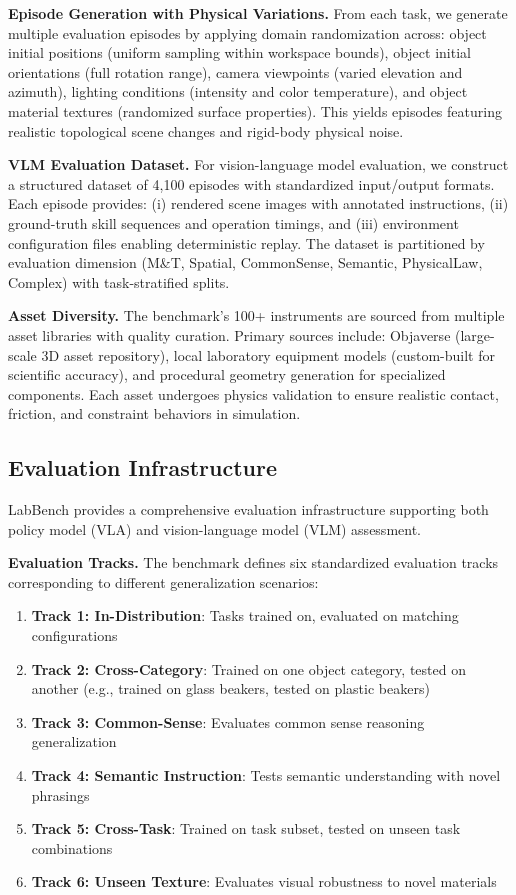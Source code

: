 \documentclass[letterpaper]{article} %
\begin{document}
\textbf{Episode Generation with Physical Variations.} From each task, we generate multiple evaluation episodes by applying domain randomization across: object initial positions (uniform sampling within workspace bounds), object initial orientations (full rotation range), camera viewpoints (varied elevation and azimuth), lighting conditions (intensity and color temperature), and object material textures (randomized surface properties). This yields episodes featuring realistic topological scene changes and rigid-body physical noise.

\textbf{VLM Evaluation Dataset.} For vision-language model evaluation, we construct a structured dataset of 4,100 episodes with standardized input/output formats. Each episode provides: (i) rendered scene images with annotated instructions, (ii) ground-truth skill sequences and operation timings, and (iii) environment configuration files enabling deterministic replay. The dataset is partitioned by evaluation dimension (M\&T, Spatial, CommonSense, Semantic, PhysicalLaw, Complex) with task-stratified splits.

\textbf{Asset Diversity.} The benchmark's 100+ instruments are sourced from multiple asset libraries with quality curation. Primary sources include: Objaverse \cite{deitke2023objaverse} (large-scale 3D asset repository), local laboratory equipment models (custom-built for scientific accuracy), and procedural geometry generation for specialized components. Each asset undergoes physics validation to ensure realistic contact, friction, and constraint behaviors in simulation.

\subsection{Evaluation Infrastructure}

LabBench provides a comprehensive evaluation infrastructure supporting both policy model (VLA) and vision-language model (VLM) assessment.

\textbf{Evaluation Tracks.} The benchmark defines six standardized evaluation tracks corresponding to different generalization scenarios:

\begin{enumerate}
    \item \textbf{Track 1: In-Distribution}: Tasks trained on, evaluated on matching configurations
    \item \textbf{Track 2: Cross-Category}: Trained on one object category, tested on another (e.g., trained on glass beakers, tested on plastic beakers)
    \item \textbf{Track 3: Common-Sense}: Evaluates common sense reasoning generalization
    \item \textbf{Track 4: Semantic Instruction}: Tests semantic understanding with novel phrasings
    \item \textbf{Track 5: Cross-Task}: Trained on task subset, tested on unseen task combinations
    \item \textbf{Track 6: Unseen Texture}: Evaluates visual robustness to novel materials
\end{enumerate}
\end{document}
